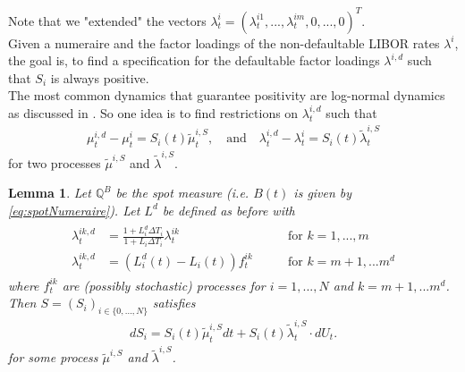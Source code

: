 \documentclass[12pt]{article}
\newtheorem{lemma}[theorem]{Lemma}
\begin{document}
	Note that we "extended" the vectors $\lambda^{i}_t = (\lambda^{i 1}_t, ..., \lambda^{i m}_t, 0, ..., 0)^T$.\\
	Given a numeraire and the factor loadings of the non-defaultable LIBOR rates $\lambda^i$, the goal is, to find a specification for the defaultable factor loadings $\lambda^{i,d}$ such that $S_i$ is always positive.\\
	The most common dynamics that guarantee positivity are log-normal dynamics as discussed in . So one idea is to find restrictions on $\lambda^{i,d}_t$ such that 
	\begin{align*}
		\mu^{i,d}_t - \mu^{i}_t = S_i(t)\tilde{\mu}^{i,S}_t, \quad \text{and} 
		\quad \lambda^{i,d}_t - \lambda^{i}_t = S_i(t)\tilde{\lambda}^{i,S}_t
	\end{align*}
	for two processes $\tilde{\mu}^{i,S}$ and $\tilde{\lambda}^{i,S}$.
	\begin{lemma}
		Let $\mathbb{Q}^B$ be the spot measure (i.e. $B(t)$ is given by \cref{eq:spotNumeraire}).
		Let $L^d$ be defined as before with 
		\begin{align}
			\begin{aligned}
				\lambda^{i k,d}_t &= \frac{1+L^d_i\Delta T_i}{1+L_i\Delta T_i} \lambda^{i k}_t \quad \quad & \text{for } k= 1,...,m\\
				\lambda^{i k,d}_t &= \left(L^d_i(t) - L_i(t)\right)f^{i k}_t \quad \quad & \text{for } k= m+1, ... m^d
			\end{aligned}
		\end{align}
		where $f^{i k}_t$ are (possibly stochastic) processes for $i=1, ..., N$ and $k= m+1, ... m^d$.\\
		Then $S = (S_i)_{i\in \{0, ..., N\}}$ satisfies 
		\begin{align*}
			dS_i = S_i(t)\tilde{\mu}^{i,S}_t dt + S_i(t)\tilde{\lambda}^{i,S}_t \cdot dU_t.
		\end{align*}
		for some process $\tilde{\mu}^{i,S}$ and $\tilde{\lambda}^{i,S}$.
	\end{lemma}
\end{document}
